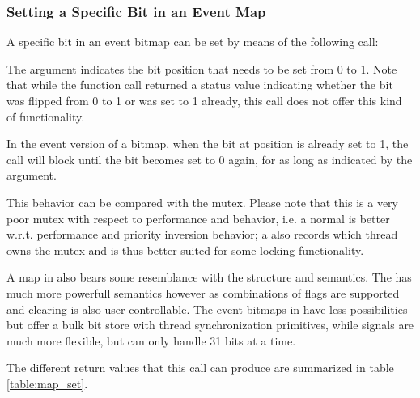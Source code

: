 \subsubsection{Setting a Specific Bit in an Event Map}

A specific bit in an event bitmap can be set by means of the following call:


The  argument indicates the bit position that needs to be set
from 0 to 1. Note that while the  function call
returned a status value indicating whether the bit was flipped from 0 to 1 or
was set to 1 already, this call does not offer this kind of functionality.

In the event version of a bitmap, when the bit at position  is
already set to 1, the call will block until the bit becomes set to 0 again,
for as long as indicated by the  argument.

This behavior can be compared with the mutex. Please note that this is a
very poor mutex with respect to performance and behavior, i.e. a normal
 is better w.r.t. performance and priority inversion
behavior; a  also records which thread owns the mutex and
is thus better suited for some locking functionality.

A map in \oswald also bears some resemblance with the 
structure and semantics. The  has much more powerfull
semantics however as combinations of flags are supported and clearing is
also user controllable. The event bitmaps in \oswald have less possibilities
but offer a bulk bit store with thread synchronization primitives, while
signals are much more flexible, but can only handle 31 bits at a time.

The different return values that this call can produce are summarized
in table \ref{table:map_set}.  



